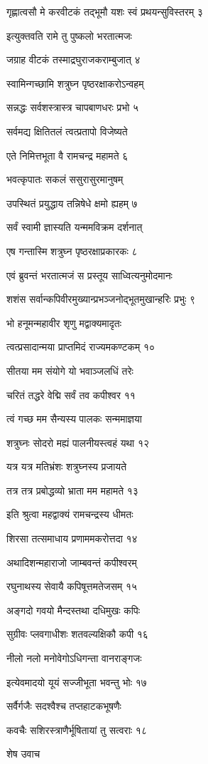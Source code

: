 गृह्णात्वसौ मे करवीटकं तद्भूमौ यशः स्वं प्रथयन्सुविस्तरम् ३

इत्युक्तवति रामे तु पुष्कलो भरतात्मजः

जग्राह वीटकं तस्माद्रघुराजकराम्बुजात् ४

स्वामिन्गच्छामि शत्रुघ्न पृष्ठरक्षाकरोऽन्वहम्

सन्नद्धः सर्वशस्त्रास्त्र चापबाणधरः प्रभो ५

सर्वमद्य क्षितितलं त्वत्प्रतापो विजेष्यते

एते निमित्तभूता वै रामचन्द्र महामते ६

भवत्कृपातः सकलं ससुरासुरमानुषम्

उपस्थितं प्रयुद्धाय तन्निषेधे क्षमो ह्यहम् ७

सर्वं स्वामी ज्ञास्यति यन्ममविक्रम दर्शनात्

एष गन्तास्मि शत्रुघ्न पृष्ठरक्षाप्रकारकः ८

एवं ब्रुवन्तं भरतात्मजं स प्रस्तूय साध्वित्यनुमोदमानः

शशंस सर्वान्कपिवीरमुख्यान्प्रभञ्जनोद्भूतमुखान्हरिः प्रभुः ९

भो हनूमन्महावीर शृणु मद्वाक्यमादृतः

त्वत्प्रसादान्मया प्राप्तमिदं राज्यमकण्टकम् १०

सीतया मम संयोगे यो भवाञ्जलधिं तरेः

चरितं तद्धरे वेद्मि सर्वं तव कपीश्वर ११

त्वं गच्छ मम सैन्यस्य पालकः सन्ममाज्ञया

शत्रुघ्नः सोदरो मह्यं पालनीयस्त्वहं यथा १२

यत्र यत्र मतिभ्रंशः शत्रुघ्नस्य प्रजायते

तत्र तत्र प्रबोद्धव्यो भ्राता मम महामते १३

इति श्रुत्वा महद्वाक्यं रामचन्द्रस्य धीमतः

शिरसा तत्समाधाय प्रणाममकरोत्तदा १४

अथादिशन्महाराजो जाम्बवन्तं कपीश्वरम्

रघुनाथस्य सेवायै कपिषूत्तमतेजसम् १५

अङ्गदो गवयो मैन्दस्तथा दधिमुखः कपिः

सुग्रीवः प्लवगाधीशः शतवल्यक्षिकौ कपी १६

नीलो नलो मनोवेगोऽधिगन्ता वानराङ्गजः

इत्येवमादयो यूयं सज्जीभूता भवन्तु भोः १७

सर्वैर्गजैः सदश्वैश्च तप्तहाटकभूषणैः

कवचैः सशिरस्त्राणैर्भूषितायां तु सत्वराः १८

शेष उवाच

